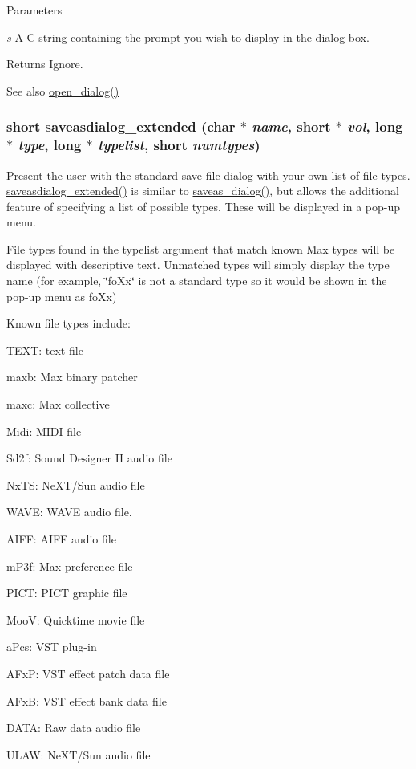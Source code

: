 \begin{DoxyParams}{Parameters}
\item[{\em s}]A C-\/string containing the prompt you wish to display in the dialog box. \end{DoxyParams}
\begin{DoxyReturn}{Returns}
Ignore.
\end{DoxyReturn}
\begin{DoxySeeAlso}{See also}
\hyperlink{group__files_ga0d8fd0b13e2e623298a45e846af3fe1a}{open\_\-dialog()} 
\end{DoxySeeAlso}
\hypertarget{group__files_gad43815aaa436e518a5cc68d2a340e4de}{
\subsubsection[{saveasdialog\_\-extended}]{\setlength{\rightskip}{0pt plus 5cm}short saveasdialog\_\-extended (char $\ast$ {\em name}, \/  short $\ast$ {\em vol}, \/  long $\ast$ {\em type}, \/  long $\ast$ {\em typelist}, \/  short {\em numtypes})}}
\label{group__files_gad43815aaa436e518a5cc68d2a340e4de}


Present the user with the standard save file dialog with your own list of file types. \hyperlink{group__files_gad43815aaa436e518a5cc68d2a340e4de}{saveasdialog\_\-extended()} is similar to \hyperlink{group__files_gaf526009ce84aed6f6213c4a99f6bd72d}{saveas\_\-dialog()}, but allows the additional feature of specifying a list of possible types. These will be displayed in a pop-\/up menu.

File types found in the typelist argument that match known Max types will be displayed with descriptive text. Unmatched types will simply display the type name (for example, \char`\"{}foXx\char`\"{} is not a standard type so it would be shown in the pop-\/up menu as foXx)

Known file types include:
\begin{DoxyItemize}
\item TEXT: text file
\item maxb: Max binary patcher
\item maxc: Max collective
\item Midi: MIDI file
\item Sd2f: Sound Designer II audio file
\item NxTS: NeXT/Sun audio file
\item WAVE: WAVE audio file.
\item AIFF: AIFF audio file
\item mP3f: Max preference file
\item PICT: PICT graphic file
\item MooV: Quicktime movie file
\item aPcs: VST plug-\/in
\item AFxP: VST effect patch data file
\item AFxB: VST effect bank data file
\item DATA: Raw data audio file
\item ULAW: NeXT/Sun audio file
\end{DoxyItemize}


